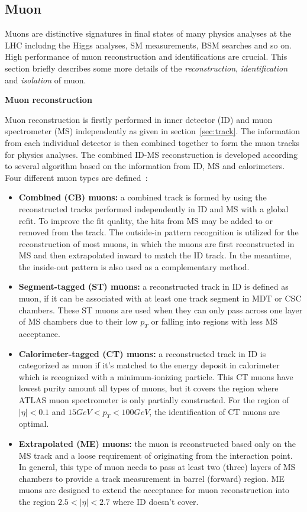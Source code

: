 \subsection{Muon}
\label{sec:muon}

Muons are distinctive signatures in final states of many physics analyses at the LHC includng the Higgs analyses, SM measurements, BSM searches and so on. 
High performance of muon reconstruction and identifications are crucial.
This section briefly describes some more details of the \textit{reconstruction}, \textit{identification} and \textit{isolation} of muon.

\textbf{Muon reconstruction}

Muon reconstruction is firstly performed in inner detector (ID) and muon spectrometer (MS) independently as given in section~\ref{sec:track}.
The information from each individual detector is then combined together to form the muon tracks for physics analyses.
The combined ID-MS reconstruction is developed according to several algorithm based on the information from ID, MS and calorimeters.
Four different muon types are defined~\cite{Aad:2016jkr}:
\begin{itemize}
	\item \textbf{Combined (CB) muons:} a combined track is formed by using the reconstructed tracks performed independently in ID and MS with a global refit. To improve the fit quality, the hits from MS may be added to or removed from the track. The outside-in pattern recognition is utilized for the reconstruction of most muons, in which the muons are first reconstructed in MS and then extrapolated inward to match the ID track. In the meantime, the inside-out pattern is also used as a complementary method.
	\item \textbf{Segment-tagged (ST) muons:} a reconstructed track in ID is defined as muon, if it can be associated with at least one track segment in MDT or CSC chambers. These ST muons are used when they can only pass across one layer of MS chambers due to their low $p_{T}$ or falling into regions with less MS acceptance.
	\item \textbf{Calorimeter-tagged (CT) muons:} a reconstructed track in ID is categorized as muon if it's matched to the energy deposit in calorimeter which is recognized with a minimum-ionizing particle. This CT muons have lowest purity amount all types of muons, but it covers the region where ATLAS muon spectrometer is only partially constructed. For the region of $|\eta| < 0.1$ and $15 GeV < p_{T} < 100 GeV$, the identification of CT muons are optimal.
	\item \textbf{Extrapolated (ME) muons:} the muon is reconstructed based only on the MS track and a loose requirement of originating from the interaction point. In general, this type of muon needs to pass at least two (three) layers of MS chambers to provide a track measurement in barrel (forward) region. ME muons are designed to extend the acceptance for muon reconstruction into the region $2.5 < |\eta| < 2.7$ where ID doesn't cover.
\end{itemize}

